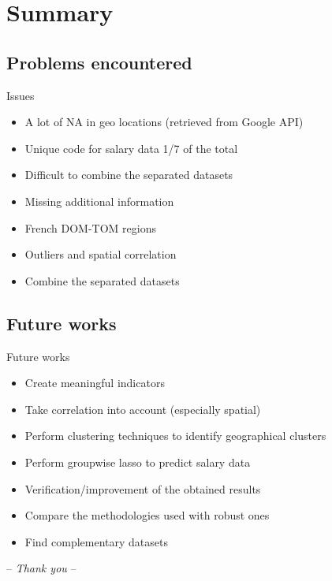 \documentclass[12pt]{beamer}
\begin{document}
\section{Summary}


\subsection{Problems encountered}


\begin{frame}{\textcolor{bscuro}{Issues}}
	\begin{itemize}
		\item A lot of NA in geo locations (retrieved from Google API)
		\item Unique code for salary data 1/7 of the total 
		\item Difficult to combine the separated datasets
		\item Missing additional information 
		\item French DOM-TOM regions
		\item Outliers and spatial correlation
		\item Combine the separated datasets
	\end{itemize}
\end{frame}			


\subsection{Future works}


\begin{frame}{\textcolor{bscuro}{Future works}}
	\begin{itemize}
		\item Create meaningful indicators
		\item Take correlation into account (especially spatial)
		\item Perform clustering techniques to identify geographical clusters
		\item Perform groupwise lasso to predict salary data
		\item Verification/improvement of the obtained results 
		\item Compare the methodologies used with robust ones
		\item Find complementary datasets
	\end{itemize}	
\end{frame}		


\begin{frame}
	\centerline{\Huge\textcolor{bscuro}{ -- \emph{Thank you} -- }}
\end{frame}
\end{document}
